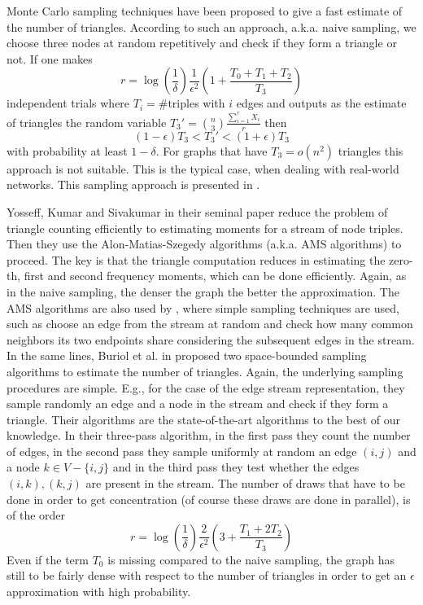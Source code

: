 \documentclass{llncs}
\begin{document}
Monte Carlo sampling techniques have been proposed to give a fast estimate of the number of triangles.
According to such an approach, a.k.a. naive sampling, we choose three nodes at random repetitively and check if they form a triangle or not. 
If one makes $$ r = \log({\frac{1}{\delta}})\frac{1}{\epsilon^2}(1+\frac{T_0+T_1+T_2}{T_3})$$
independent trials where $T_i=\#$triples with $i$ edges  and outputs as the estimate of triangles the random variable $ T_3' = {n \choose 3} \frac{\sum_{i=1}^r X_i}{r}$
then  $$(1-\epsilon)T_3 < T_3' < (1+\epsilon)T_3 $$ with probability at least $1- \delta$.
For graphs that have $T_3=o(n^2)$ triangles this approach is not suitable. This is the typical case, when dealing with real-world networks. 
This sampling approach is presented in \cite{shank:wanger1}. 


Yosseff, Kumar and Sivakumar in their seminal paper \cite{yosseff} reduce the problem of triangle counting efficiently to estimating
moments for a stream of node triples. Then they use the Alon-Matias-Szegedy algorithms \cite{amsalgos} (a.k.a. AMS algorithms) to proceed. 
The key is that the triangle computation reduces in estimating the zero-th, first and second frequency moments, which can be done efficiently. 
Again, as in the naive sampling, the denser the graph the better the approximation.
The AMS algorithms are also used by \cite{jowhary}, where simple sampling techniques are used, such
as choose an edge from the stream at random and check how many common neighbors its two endpoints share considering the subsequent edges 
in the stream. 
In the same lines, Buriol et al. in \cite{buriol} proposed two space-bounded sampling algorithms to estimate the number of triangles. 
Again, the underlying sampling procedures are simple. E.g., for the case of the edge stream representation, they sample randomly
an edge and a node in the stream and check if they form a triangle. Their algorithms are the state-of-the-art algorithms to 
the best of our knowledge. In their three-pass algorithm, in the first pass they count the number of edges, in the second pass 
they sample uniformly at random an edge $(i,j)$ and a node $k \in V-\{i,j\}$ and in the third pass they test
whether the edges $(i,k),(k,j)$ are present in the stream. The number of draws that have to be done in order to get 
concentration (of course these draws are done in parallel), is of the order
$$ r = \log({\frac{1}{\delta}})\frac{2}{\epsilon^2}(3+\frac{T_1+2T_2}{T_3})$$
Even if the term $T_0$ is missing compared to the naive sampling, the graph has still to be fairly dense with respect
to the number of triangles in order to get an $\epsilon$ approximation with high probability. 
\end{document}
